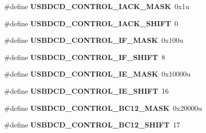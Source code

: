 \begin{DoxyCompactItemize}
\item 
\#define {\bfseries U\+S\+B\+D\+C\+D\+\_\+\+C\+O\+N\+T\+R\+O\+L\+\_\+\+I\+A\+C\+K\+\_\+\+M\+A\+SK}~0x1u\hypertarget{group__USBDCD__Register__Masks_ga23b5eadab7d4201af1198723a3b93ae5}{}\label{group__USBDCD__Register__Masks_ga23b5eadab7d4201af1198723a3b93ae5}

\item 
\#define {\bfseries U\+S\+B\+D\+C\+D\+\_\+\+C\+O\+N\+T\+R\+O\+L\+\_\+\+I\+A\+C\+K\+\_\+\+S\+H\+I\+FT}~0\hypertarget{group__USBDCD__Register__Masks_ga4a96149273b083d48c5917e9b915b92f}{}\label{group__USBDCD__Register__Masks_ga4a96149273b083d48c5917e9b915b92f}

\item 
\#define {\bfseries U\+S\+B\+D\+C\+D\+\_\+\+C\+O\+N\+T\+R\+O\+L\+\_\+\+I\+F\+\_\+\+M\+A\+SK}~0x100u\hypertarget{group__USBDCD__Register__Masks_gabedad7b2fec7990f45af8add013a19c7}{}\label{group__USBDCD__Register__Masks_gabedad7b2fec7990f45af8add013a19c7}

\item 
\#define {\bfseries U\+S\+B\+D\+C\+D\+\_\+\+C\+O\+N\+T\+R\+O\+L\+\_\+\+I\+F\+\_\+\+S\+H\+I\+FT}~8\hypertarget{group__USBDCD__Register__Masks_ga576f9434f9947991055f40c1ab3a38c1}{}\label{group__USBDCD__Register__Masks_ga576f9434f9947991055f40c1ab3a38c1}

\item 
\#define {\bfseries U\+S\+B\+D\+C\+D\+\_\+\+C\+O\+N\+T\+R\+O\+L\+\_\+\+I\+E\+\_\+\+M\+A\+SK}~0x10000u\hypertarget{group__USBDCD__Register__Masks_ga44f183d0863aeac1154727de57ee6fb6}{}\label{group__USBDCD__Register__Masks_ga44f183d0863aeac1154727de57ee6fb6}

\item 
\#define {\bfseries U\+S\+B\+D\+C\+D\+\_\+\+C\+O\+N\+T\+R\+O\+L\+\_\+\+I\+E\+\_\+\+S\+H\+I\+FT}~16\hypertarget{group__USBDCD__Register__Masks_ga33f53d29349cc16bb002486da4472ece}{}\label{group__USBDCD__Register__Masks_ga33f53d29349cc16bb002486da4472ece}

\item 
\#define {\bfseries U\+S\+B\+D\+C\+D\+\_\+\+C\+O\+N\+T\+R\+O\+L\+\_\+\+B\+C12\+\_\+\+M\+A\+SK}~0x20000u\hypertarget{group__USBDCD__Register__Masks_ga55366a87bd0cbbbdb98b889e603ff98b}{}\label{group__USBDCD__Register__Masks_ga55366a87bd0cbbbdb98b889e603ff98b}

\item 
\#define {\bfseries U\+S\+B\+D\+C\+D\+\_\+\+C\+O\+N\+T\+R\+O\+L\+\_\+\+B\+C12\+\_\+\+S\+H\+I\+FT}~17\hypertarget{group__USBDCD__Register__Masks_ga156a178bc13853a3d4fc1feef734734e}{}\label{group__USBDCD__Register__Masks_ga156a178bc13853a3d4fc1feef734734e}


\end{DoxyCompactItemize}
